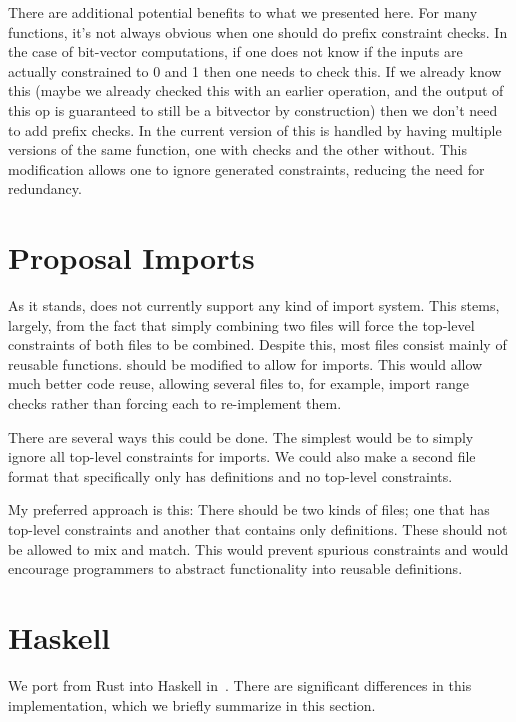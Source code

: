 \documentclass[
    9pt,            
    techreport,       
    affiltop,       
]{art}
\begin{document}
There are additional potential benefits to what we presented here. For many functions, it's not always obvious when one should do prefix constraint checks. In the case of bit-vector computations, if one does not know if the inputs are actually constrained to 0 and 1 then one needs to check this. If we already know this (maybe we already checked this with an earlier operation, and the output of this op is guaranteed to still be a bitvector by construction) then we don't need to add prefix checks. In the current version of \VampIR{} this is handled by having multiple versions of the same function, one with checks and the other without. This modification allows one to ignore generated constraints, reducing the need for redundancy.

\section{Proposal \VampIR{} Imports}
\label{sec:imports}

As it stands, \VampIR{} does not currently support any kind of import system. This stems, largely, from the fact that simply combining two files will force the top-level constraints of both files to be combined. Despite this, most \VampIR{} files consist mainly of reusable functions. \VampIR{} should be modified to allow for imports. This would allow much better code reuse, allowing several files to, for example, import range checks rather than forcing each to re-implement them.

There are several ways this could be done. The simplest would be to simply ignore all top-level constraints for imports. We could also make a second file format that specifically only has definitions and no top-level constraints.

My preferred approach is this: There should be two kinds of \VampIR{} files; one that has top-level constraints and another that contains only definitions. These should not be allowed to mix and match. This would prevent spurious constraints and would encourage programmers to abstract functionality into reusable definitions.

\section{\VampIR{} Haskell}\label{sec:vamp-ir-haskell}

We port \VampIR{} from Rust into Haskell in~\citep{vamp-ir-haskell}. There are significant differences in this \VampIR{} implementation, which we briefly summarize in this section.
\end{document}
